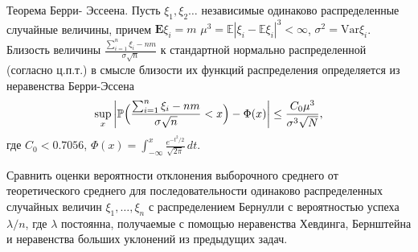 \begin{remark}
\begin{comment}
$$
\Phi\Bigl(2\alpha\sqrt{n}\Bigr)\geqslant\frac{\gamma+1}{2} \; \Rightarrow\; 
\quad n\geqslant \Bigl( \tfrac{1}{2\alpha}\Phi^{-1}\bigl(\tfrac{\gamma+1}{2}\bigr)\Bigr)^2 . 
$$
Подставляя значения $\alpha$ и $\gamma$, находим $\quad n\geqslant 665$. 
\end{comment}
Теорема Берри- Эссеена. Пусть $\xi_1, \xi_2\dots$ независимые одинаково распределенные случайные величины, причем $\mathbf{E}\xi_i = m$
 $\mu^3={\mathbb E}|\xi_i - {\mathbb E}\xi_i|^3<\infty$, $\sigma^2=\text{Var} \xi_i$.
Близость величины $\frac{\sum_{i=1}^{n}\xi_i-nm}{\sigma\sqrt{n}}$ к стандартной нормально распределенной (согласно ц.п.т.) в смысле 
близости их функций распределения определяется из неравенства Берри-Эссена 
$$
\sup\limits_x \left| {\mathbb P}\Bigl( \frac{\sum_{i=1}^{n}\xi_i-nm}{\sigma\sqrt{n}}<x \Bigr) - \Phi(x) 
\right| \le \frac{C_0 \mu^3}{\sigma^3 \sqrt{N}} , 
$$
где $C_0<0.7056$,
$\Phi(x)=\int_{-\infty}^x \frac{e^{-t^2/2}}{\sqrt{2\pi}}\, dt$. 

\end{remark}

\begin{problem}
Сравнить оценки вероятности отклонения выборочного среднего от теоретического среднего для последовательности одинаково распределенных случайных величин $\xi_1,\dots,\xi_n$ с распределением Бернулли с вероятностью успеха $\lambda/n$, где $\lambda$ постоянна, получаемые с помощью неравенства Хевдинга, Бернштейна и неравенства больших уклонений из предыдущих задач.
\end{problem}
\medskip 


